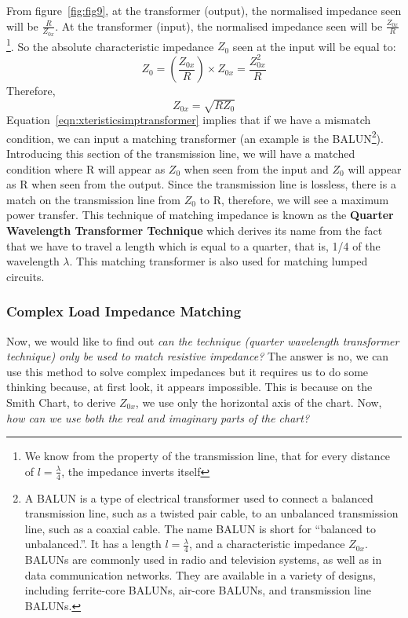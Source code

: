 From figure~\ref{fig:fig9}, at the transformer (output), the normalised impedance seen will be $\frac{R}{Z_{0x}}$. At the transformer (input), the normalised impedance seen will be $\frac{Z_{0x}}{R}$\footnote{
We know from the property of the transmission line, that for every distance of $l = \frac{\lambda}{4}$, the impedance inverts itself
}. So the absolute characteristic impedance $ Z_0$ seen at the input will be equal to: 
\begin{dmath*}
Z_0=\left(\frac{Z_{0x}}{R}\right)\times Z_{0x}
=\frac{Z_{0x}^2}{R}
\end{dmath*}
Therefore,
\begin{equation}
Z_{0x}=\sqrt{RZ_0}
\label{eqn:xteristicsimptransformer}
\end{equation}
Equation~\eqref{eqn:xteristicsimptransformer} implies that if we have a mismatch condition, we can input a matching transformer (an example is the \uppercase{balun}\footnote{
A \uppercase{balun} is a type of electrical transformer used to connect a balanced transmission line, such as a twisted pair cable, to an unbalanced transmission line, such as a coaxial cable. The name \uppercase{balun} is short for \textquotedblleft\;balanced to unbalanced.\textquotedblright\;. It has a length $l=\frac{\lambda}{4}$, and a characteristic impedance $Z_{0x}$. \uppercase{Balun}s are commonly used in radio and television systems, as well as in data communication networks. They are available in a variety of designs, including ferrite-core \uppercase{balun}s, air-core \uppercase{balun}s, and transmission line \uppercase{balun}s.
}). Introducing this section of the transmission line, we will have a matched condition where R will appear as $ Z_0$ when seen from the input and $ Z_0$ will appear as R when seen from the output. Since the transmission line is lossless, there is a match on the transmission line from $ Z_0$ to R, therefore, we will see a maximum power transfer.
This technique of matching impedance is known as the \textbf{Quarter Wavelength Transformer Technique} which derives its name from the fact that we have to travel a length which is equal to a quarter, that is, 1/4 of the wavelength $\lambda$. This matching transformer is also used for matching lumped circuits.

\subsubsection{Complex Load Impedance Matching}
Now, we would like to find out \emph{can the technique (quarter wavelength transformer technique) only be used to match resistive impedance?} The answer is no, we can use this method to solve complex impedances but it requires us to do some thinking because, at first look, it appears impossible. This is because on the Smith Chart, to derive $Z_{0x}$, we use only the horizontal axis of the chart. Now, \emph{how can we use both the real and imaginary parts of the chart?}

